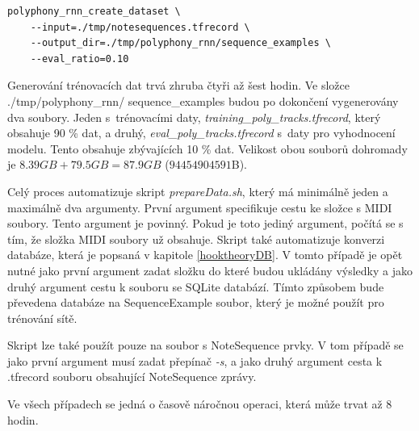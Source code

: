 \begin{verbatim}
polyphony_rnn_create_dataset \
    --input=./tmp/notesequences.tfrecord \
    --output_dir=./tmp/polyphony_rnn/sequence_examples \
    --eval_ratio=0.10
\end{verbatim}
Generování trénovacích dat trvá zhruba čtyři až šest hodin.
Ve složce ./tmp/polyphony\_rnn/ sequence\_examples budou po dokončení
vygenerovány dva soubory. 
Jeden s~trénovacími daty, \emph{training\_poly\_tracks.tfrecord},
který obsahuje 90 \% dat,
a druhý, \emph{eval\_poly\_tracks.tfrecord} s~daty pro vyhodnocení modelu.
Tento obsahuje zbývajících 10 \% dat.
Velikost obou souborů dohromady je $8.39GB + 79.5GB = 87.9GB$ ($94 454 904 591$B).
\par

Celý proces automatizuje skript \emph{prepareData.sh},
který má minimálně jeden a maximálně dva argumenty.
První argument specifikuje cestu ke složce s MIDI soubory.
Tento argument je povinný.
Pokud je toto jediný argument, počítá se s tím,
že složka MIDI soubory už obsahuje.
Skript také automatizuje konverzi databáze, která je popsaná v kapitole \ref{hooktheoryDB}.
V tomto případě je opět nutné jako první argument zadat 
složku do které budou ukládány výsledky
a jako druhý argument cestu k souboru se SQLite databází.
Tímto způsobem bude převedena databáze na SequenceExample soubor,
který je možné použít pro trénování sítě.
\par

Skript lze také použít pouze na soubor s NoteSequence prvky.
V tom případě se jako první argument musí zadat přepínač \emph{-s},
a jako druhý argument cesta k .tfrecord souboru obsahující NoteSequence zprávy.
\par

Ve všech případech se jedná o časově náročnou operaci, která může trvat až 8 hodin.

